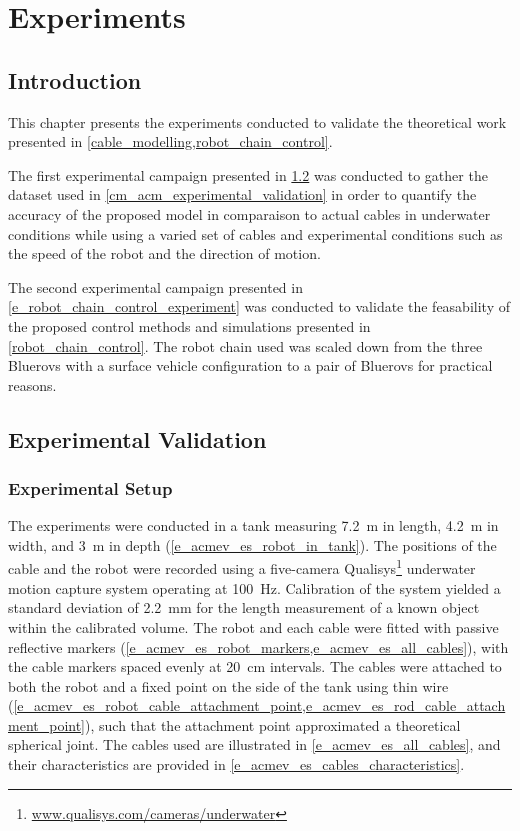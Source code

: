 \chapter{Experiments}
\label{experiments}

\minitoc{}

\section{Introduction}

This chapter presents the experiments conducted to validate the theoretical work presented in
\cref{cable_modelling,robot_chain_control}.

The first experimental campaign presented in
\cref{e_augmented_catenary_model_experimental_validation} was conducted to gather the dataset used
in \cref{cm_acm_experimental_validation} in order to quantify the accuracy of the proposed model in
comparaison to actual cables in underwater conditions while using a varied set of cables and
experimental conditions such as the speed of the robot and the direction of motion.

The second experimental campaign presented in \cref{e_robot_chain_control_experiment} was conducted
to validate the feasability of the proposed control methods and simulations presented in
\cref{robot_chain_control}. The robot chain used was scaled down from the three Bluerovs with a
surface vehicle configuration to a pair of Bluerovs for practical reasons.

\section{\augmentedmodeltitle{} Experimental Validation} \label{e_augmented_catenary_model_experimental_validation}

\subsection{Experimental Setup}
\label{e_acmev_experimental_setup}

The experiments were conducted in a tank measuring \qty{7.2}{\meter} in length, \qty{4.2}{\meter}
in width, and \qty{3}{\meter} in depth (\cref{e_acmev_es_robot_in_tank}). The positions of the
cable and the robot were recorded using a five-camera
Qualisys\footnote{\url{www.qualisys.com/cameras/underwater}} underwater motion capture system
operating at \qty{100}{\Hz}. Calibration of the system yielded a standard deviation of
\qty{2.2}{\mm} for the length measurement of a known object within the calibrated volume. The robot
and each cable were fitted with passive reflective markers
(\cref{e_acmev_es_robot_markers,e_acmev_es_all_cables}), with the cable markers spaced evenly at
\qty{20}{\centi\meter} intervals. The cables were attached to both the robot and a fixed point on
the side of the tank using thin wire
(\cref{e_acmev_es_robot_cable_attachment_point,e_acmev_es_rod_cable_attachment_point}), such that
the attachment point approximated a theoretical spherical joint. The cables used are illustrated in
\cref{e_acmev_es_all_cables}, and their characteristics are provided in
\cref{e_acmev_es_cables_characteristics}.

